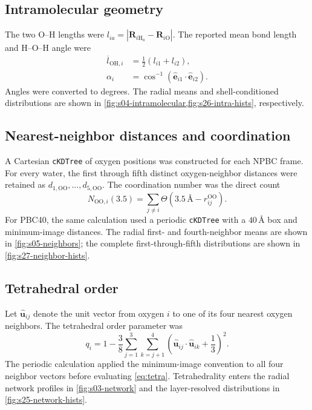 \documentclass[11pt]{article}
\newcommand{\angstrom}{\text{\AA}}
\newcommand{\OO}{\mathrm{OO}}
\newcommand{\OH}{\mathrm{OH}}
\begin{document}
\subsection{Intramolecular geometry}

The two O--H lengths were \(l_{ia}=|\bm R_{i\mathrm H_a}-\bm R_{i\mathrm O}|\).
The reported mean bond length and H--O--H angle were
\begin{align}
 \overline l_{\OH,i}&=\frac12(l_{i1}+l_{i2}),\\
 \alpha_i&=\cos^{-1}(\hat{\bm e}_{i1}\cdot\hat{\bm e}_{i2}).
 \label{eq:intra}
\end{align}
Angles were converted to degrees.
The radial means and shell-conditioned distributions are shown in
\cref{fig:s04-intramolecular,fig:s26-intra-hists}, respectively.

\subsection{Nearest-neighbor distances and coordination}

A Cartesian \texttt{cKDTree} of oxygen positions was constructed for each
NPBC frame.  For every water, the first through fifth distinct oxygen-neighbor
distances were retained as \(d_{1,\OO},\ldots,d_{5,\OO}\).  The coordination
number was the direct count
\begin{equation}
 N_{\OO,i}(3.5)=\sum_{j\ne i}
 \Theta(3.5\,\angstrom-r_{ij}^{\OO}).
 \label{eq:coord}
\end{equation}
For PBC40, the same calculation used a periodic \texttt{cKDTree} with a
\(40\,\angstrom\) box and minimum-image distances.
The radial first- and fourth-neighbor means are shown in
\cref{fig:s05-neighbors}; the complete first-through-fifth distributions are
shown in \cref{fig:s27-neighbor-hists}.

\subsection{Tetrahedral order}

Let \(\hat{\bm u}_{ij}\) denote the unit vector from oxygen \(i\) to one of
its four nearest oxygen neighbors.  The tetrahedral order parameter was
\begin{equation}
 q_i=1-\frac{3}{8}\sum_{j=1}^{3}\sum_{k=j+1}^{4}
 \left(\hat{\bm u}_{ij}\cdot\hat{\bm u}_{ik}+\frac13\right)^2.
 \label{eq:tetra}
\end{equation}
The periodic calculation applied the minimum-image convention to all four
neighbor vectors before evaluating \cref{eq:tetra}.
Tetrahedrality enters the radial network profiles in \cref{fig:s03-network}
and the layer-resolved distributions in \cref{fig:s25-network-hists}.
\end{document}
